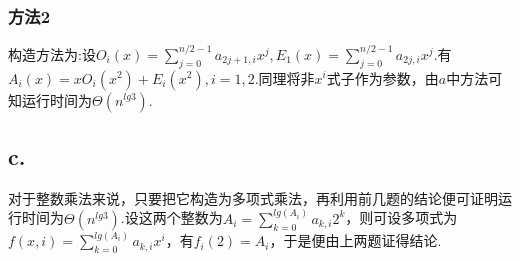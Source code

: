 \documentclass[twocolumn]{article}
\newenvironment{SChinese}{
	\CJKfamily{gbsn}
	\CJKtilde
	\CJKnospace}{}
\begin{document}
\begin{CJK}{UTF8}{}
\begin{SChinese}
					\subsubsection*{方法2}
					构造方法为:设$O_i(x)=\sum_{j=0}^{n/2-1}a_{2j+1,i}x^j,E_1(x)=\sum_{j=0}^{n/2-1}a_{2j,i}x^j$.有$A_i(x)=xO_i(x^2)+E_i(x^2),i=1,2$.同理将非$x^i$式子作为参数，由$a$中方法可知运行时间为$\Theta(n^{lg3})$.
				\subsection*{c.}
					对于整数乘法来说，只要把它构造为多项式乘法，再利用前几题的结论便可证明运行时间为$\Theta(n^{lg3})$.设这两个整数为$A_i=\sum_{k=0}^{lg(A_i)}a_{k,i}2^k$，则可设多项式为$f(x,i)=\sum_{k=0}^{lg(A_i)}a_{k,i}x^i$，有$f_i(2)=A_i$，于是便由上两题证得结论.
		\end{SChinese}
	\end{CJK}
\end{document}
